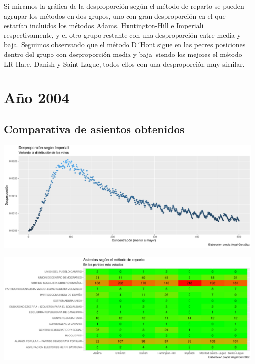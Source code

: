 \documentclass[12pt,a4paper,]{book}
\numberwithin{dummy}{section}
\theoremstyle{ocrenumbox}
\theoremstyle{blacknumex}
\theoremstyle{blacknumbox}
\theoremstyle{ocrenum}
\theoremstyle{ocrenum}
\begin{document}
Si miramos la gráfica de la desproporción según el método de reparto se
pueden agrupar los métodos en dos grupos, uno con gran desproporción en
el que estarían incluidos los métodos Adams, Huntington-Hill e Imperiali
respectivamente, y el otro grupo restante con una desproporción entre
media y baja. Seguimos observando que el método D´Hont sigue en las
peores posiciones dentro del grupo con desproporción media y baja,
siendo los mejores el método LR-Hare, Danish y Saint-Lague, todos ellos
con una desproporción muy similar.

\hypertarget{auxf1o-2004}{%
\section{Año 2004}\label{auxf1o-2004}}

\hypertarget{comparativa-de-asientos-obtenidos-8}{%
\subsection{Comparativa de asientos
obtenidos}\label{comparativa-de-asientos-obtenidos-8}}

\begin{center}\includegraphics[width=1\linewidth]{figurasR/unnamed-chunk-29-1} \end{center}

\begin{center}\includegraphics[width=1\linewidth]{figurasR/unnamed-chunk-29-2} \end{center}
\end{document}
